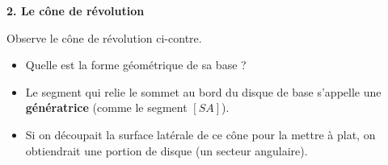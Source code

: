 \documentclass[a4paper]{book}
\begin{document}
\begin{exercice}
\begin{minipage}{0.4\textwidth}
        \end{minipage}
        
        \vspace{0.4cm}
        
        \textbf{2. Le cône de révolution} \\
        \begin{minipage}{0.55\textwidth}
            Observe le cône de révolution ci-contre.
            \begin{itemize}
                \item Quelle est la forme géométrique de sa base ? \dotfill
                \item Le segment qui relie le sommet au bord du disque de base s'appelle une \textbf{génératrice} (comme le segment $[SA]$).
                \item Si on découpait la surface latérale de ce cône pour la mettre à plat, on obtiendrait une portion de disque (un secteur angulaire).
            \end{itemize}
        \end{minipage}
        \hfill
        \begin{minipage}{0.4\textwidth}
            \centering
        \end{minipage}
    \end{exercice}

\vspace{0.4cm}
\end{document}
